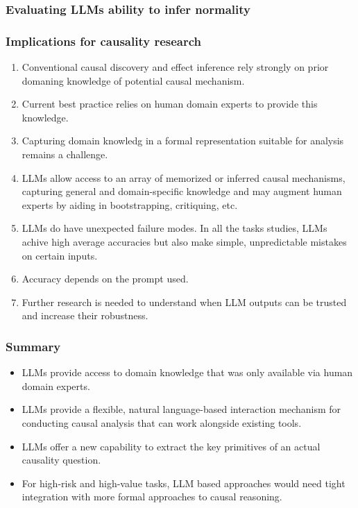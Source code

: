 \documentclass{beamer}
\begin{document}
\begin{frame}
	\frametitle{Evaluating LLMs ability to infer normality}

\end{frame}

\begin{frame}
	\frametitle{Implications for causality research}
	\begin{enumerate}
		\item Conventional causal discovery and effect inference rely strongly on prior domaning knowledge of potential causal mechanism. 
		\item Current best practice relies on human domain experts to provide this knowledge.
		\item Capturing domain knowledg in a formal representation suitable for analysis remains a challenge.
		\item LLMs allow access to an array of memorized or inferred causal mechanisms, capturing general and domain-specific knowledge and may augment human experts by aiding in bootstrapping, critiquing, etc.
		\item LLMs do have unexpected failure modes. In all the tasks studies, LLMs achive high average accuracies but also make simple, unpredictable mistakes on certain inputs.
		\item Accuracy depends on the prompt used.
		\item Further research is needed to understand when LLM outputs can be trusted and increase their robustness.
	\end{enumerate}
\end{frame}

\begin{frame}
	\frametitle{Summary}
	\begin{itemize}
		\item LLMs provide access to domain knowledge that was only available
			via human domain experts.
		\item LLMs provide a flexible, natural language-based interaction 
			mechanism for conducting causal analysis that can work
			alongside existing tools.
		\item LLMs offer a new capability to extract the key primitives of
			an actual causality question.
		\item For high-risk and high-value tasks, LLM based approaches would
			need tight integration with more formal approaches to
			causal reasoning.
	\end{itemize}
\end{frame}
\end{document}
